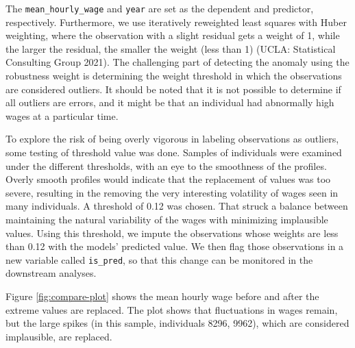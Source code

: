 \documentclass[12pt]{article}
\begin{document}
The \texttt{mean\_hourly\_wage} and \texttt{year} are set as the dependent and predictor, respectively. Furthermore, we use iteratively reweighted least squares with Huber weighting, where the observation with a slight residual gets a weight of 1, while the larger the residual, the smaller the weight (less than 1) (UCLA: Statistical Consulting Group 2021). The challenging part of detecting the anomaly using the robustness weight is determining the weight threshold in which the observations are considered outliers. It should be noted that it is not possible to determine if all outliers are errors, and it might be that an individual had abnormally high wages at a particular time.

To explore the risk of being overly vigorous in labeling observations as outliers, some testing of threshold value was done. Samples of individuals were examined under the different thresholds, with an eye to the smoothness of the profiles. Overly smooth profiles would indicate that the replacement of values was too severe, resulting in the removing the very interesting volatility of wages seen in many individuals. A threshold of 0.12 was chosen. That struck a balance between maintaining the natural variability of the wages with minimizing implausible values.
Using this threshold, we impute the observations whose weights are less than 0.12 with the models' predicted value. We then flag those observations in a new variable called \texttt{is\_pred}, so that this change can be monitored in the downstream analyses.

Figure \ref{fig:compare-plot} shows the mean hourly wage before and after the extreme values are replaced. The plot shows that fluctuations in wages remain, but the large spikes (in this sample, individuals 8296, 9962), which are considered implausible, are replaced.
\end{document}
